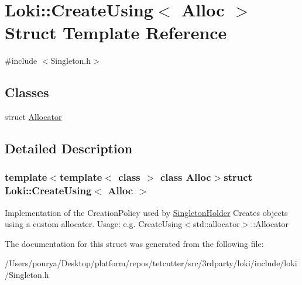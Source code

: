 \hypertarget{structLoki_1_1CreateUsing}{}\section{Loki\+:\+:Create\+Using$<$ Alloc $>$ Struct Template Reference}
\label{structLoki_1_1CreateUsing}


{\ttfamily \#include $<$Singleton.\+h$>$}

\subsection*{Classes}
\begin{DoxyCompactItemize}
\item 
struct \hyperlink{structLoki_1_1CreateUsing_1_1Allocator}{Allocator}
\end{DoxyCompactItemize}


\subsection{Detailed Description}
\subsubsection*{template$<$template$<$ class $>$ class Alloc$>$struct Loki\+::\+Create\+Using$<$ Alloc $>$}

Implementation of the Creation\+Policy used by \hyperlink{classLoki_1_1SingletonHolder}{Singleton\+Holder} Creates objects using a custom allocater. Usage\+: e.\+g. Create\+Using$<$std\+::allocator$>$\+::\+Allocator 

The documentation for this struct was generated from the following file\+:\begin{DoxyCompactItemize}
\item 
/\+Users/pourya/\+Desktop/platform/repos/tetcutter/src/3rdparty/loki/include/loki/Singleton.\+h\end{DoxyCompactItemize}
